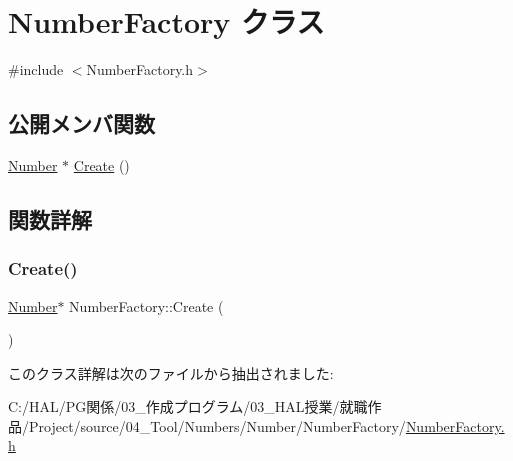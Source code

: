 \hypertarget{class_number_factory}{}\section{Number\+Factory クラス}
\label{class_number_factory}


{\ttfamily \#include $<$Number\+Factory.\+h$>$}

\subsection*{公開メンバ関数}
\begin{DoxyCompactItemize}
\item 
\mbox{\hyperlink{class_number}{Number}} $\ast$ \mbox{\hyperlink{class_number_factory_aace5458332c982b3f12265abaf5a3308}{Create}} ()
\end{DoxyCompactItemize}


\subsection{関数詳解}
\mbox{\label{class_number_factory_aace5458332c982b3f12265abaf5a3308}} 
\subsubsection{\texorpdfstring{Create()}{Create()}}
{\footnotesize\ttfamily \mbox{\hyperlink{class_number}{Number}}$\ast$ Number\+Factory\+::\+Create (\begin{DoxyParamCaption}{ }\end{DoxyParamCaption})\hspace{0.3cm}{\ttfamily [inline]}}



このクラス詳解は次のファイルから抽出されました\+:\begin{DoxyCompactItemize}
\item 
C\+:/\+H\+A\+L/\+P\+G関係/03\+\_\+作成プログラム/03\+\_\+\+H\+A\+L授業/就職作品/\+Project/source/04\+\_\+\+Tool/\+Numbers/\+Number/\+Number\+Factory/\mbox{\hyperlink{_number_factory_8h}{Number\+Factory.\+h}}\end{DoxyCompactItemize}
